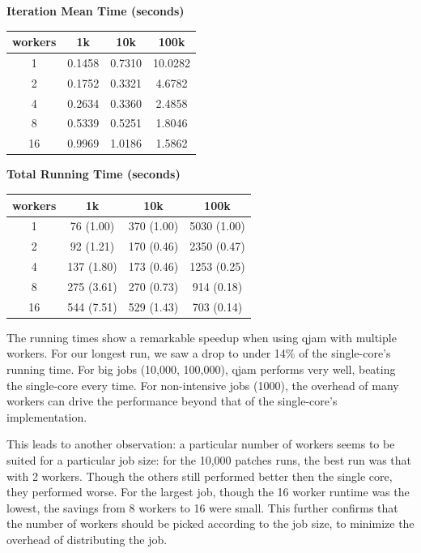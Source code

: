 \documentclass[%
  final,
  notitlepage,
  narroweqnarray,
  inline,
]{ieee}
\begin{document}
\begin{center}

\textbf{Iteration Mean Time (seconds)} \\
\begin{tabular}{cccc}
workers  & 1k  &  10k   & 100k   \\
  \hline
1  & 0.1458 & 0.7310 & 10.0282 \\
2  & 0.1752 & 0.3321 & 4.6782 \\
4  & 0.2634 & 0.3360 & 2.4858 \\
8  & 0.5339 & 0.5251 & 1.8046 \\
16 & 0.9969 & 1.0186 & 1.5862 \\
\end{tabular}

\vspace{1em}
\textbf{Total Running Time (seconds)} \\
\begin{tabular}{cccc}
workers  & 1k  &  10k   & 100k   \\
  \hline
1  & 76 (1.00) & 370 (1.00) & 5030 (1.00) \\
2  & 92 (1.21) & 170 (0.46) & 2350 (0.47) \\
4  & 137 (1.80) & 173 (0.46) & 1253 (0.25) \\
8  & 275 (3.61) & 270 (0.73) & 914 (0.18) \\
16 & 544 (7.51) & 529 (1.43) & 703 (0.14) \\
\end{tabular}
\end{center}

The running times show a remarkable speedup when using qjam with multiple
workers. For our longest run, we saw a drop to under 14\% of the single-core's
running time. For big jobs (10,000, 100,000), qjam performs very well, beating
the single-core every time. For non-intensive jobs (1000), the overhead of many
workers can drive the performance beyond that of the single-core's
implementation.

This leads to another observation: a particular number of workers seems to be
suited for a particular job size: for the 10,000 patches runs, the best run was
that with 2 workers. Though the others still performed better then the single
core, they performed worse. For the largest job, though the 16 worker runtime
was the lowest, the savings from 8 workers to 16 were small. This further
confirms that the number of workers should be picked according to the job size,
to minimize the overhead of distributing the job.
\end{document}
